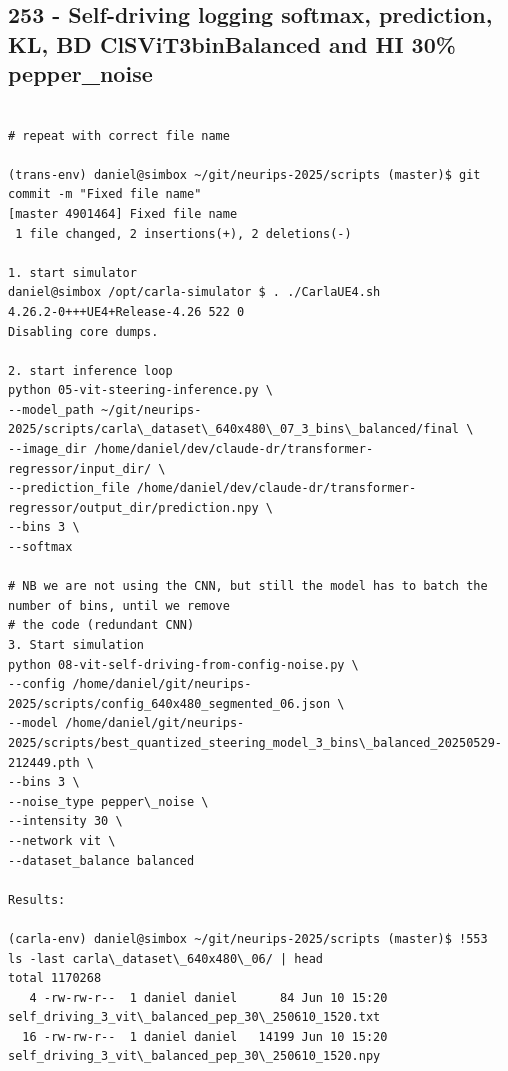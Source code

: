 \subsection{253 - Self-driving logging softmax, prediction, KL, BD ClSViT3binBalanced and HI 30\% pepper\_noise}
\label{app_res:253}
\begin{verbatim}

# repeat with correct file name

(trans-env) daniel@simbox ~/git/neurips-2025/scripts (master)$ git commit -m "Fixed file name"
[master 4901464] Fixed file name
 1 file changed, 2 insertions(+), 2 deletions(-)
 
1. start simulator
daniel@simbox /opt/carla-simulator $ . ./CarlaUE4.sh 
4.26.2-0+++UE4+Release-4.26 522 0
Disabling core dumps.

2. start inference loop
python 05-vit-steering-inference.py \
--model_path ~/git/neurips-2025/scripts/carla\_dataset\_640x480\_07_3_bins\_balanced/final \
--image_dir /home/daniel/dev/claude-dr/transformer-regressor/input_dir/ \
--prediction_file /home/daniel/dev/claude-dr/transformer-regressor/output_dir/prediction.npy \
--bins 3 \
--softmax

# NB we are not using the CNN, but still the model has to batch the number of bins, until we remove
# the code (redundant CNN)
3. Start simulation
python 08-vit-self-driving-from-config-noise.py \
--config /home/daniel/git/neurips-2025/scripts/config_640x480_segmented_06.json \
--model /home/daniel/git/neurips-2025/scripts/best_quantized_steering_model_3_bins\_balanced_20250529-212449.pth \
--bins 3 \
--noise_type pepper\_noise \
--intensity 30 \
--network vit \
--dataset_balance balanced

Results:

(carla-env) daniel@simbox ~/git/neurips-2025/scripts (master)$ !553
ls -last carla\_dataset\_640x480\_06/ | head
total 1170268
   4 -rw-rw-r--  1 daniel daniel      84 Jun 10 15:20 self_driving_3_vit\_balanced_pep_30\_250610_1520.txt
  16 -rw-rw-r--  1 daniel daniel   14199 Jun 10 15:20 self_driving_3_vit\_balanced_pep_30\_250610_1520.npy



\end{verbatim}

